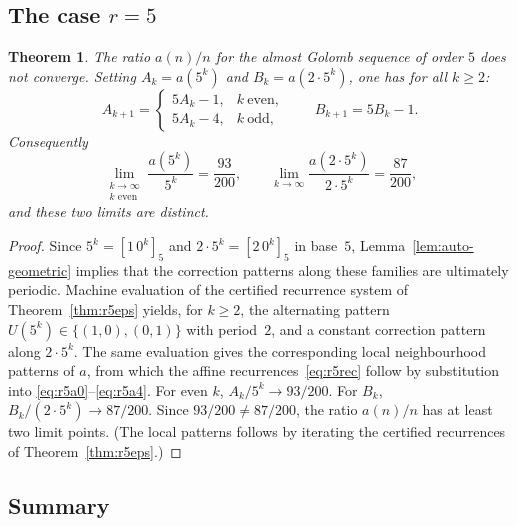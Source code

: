 \documentclass[12pt]{article}
\newtheorem{theorem}{Theorem}[section]
\theoremstyle{definition}
\theoremstyle{remark}
\begin{document}
\subsection{The case $r=5$}

\begin{theorem}\label{thm:ratio5}
The ratio $a(n)/n$ for the almost Golomb sequence of order $5$ does not converge.
Setting $A_k=a(5^k)$ and $B_k=a(2\cdot 5^k)$, one has for all $k\ge 2$:
\begin{equation}\label{eq:r5rec}
  A_{k+1} =
  \begin{cases}
    5A_k - 1, & k\ \text{even},\\
    5A_k - 4, & k\ \text{odd},
  \end{cases}
  \qquad
  B_{k+1} = 5B_k - 1.
\end{equation}
Consequently
\[
  \lim_{\substack{k\to\infty\\k\text{ even}}} \frac{a(5^k)}{5^k} = \frac{93}{200},
  \qquad
  \lim_{k\to\infty}\frac{a(2\cdot 5^k)}{2\cdot 5^k} = \frac{87}{200},
\]
and these two limits are distinct.
\end{theorem}

\begin{proof}
Since $5^k=[1\,0^k]_5$ and $2\cdot 5^k=[2\,0^k]_5$ in base~$5$,
Lemma~\ref{lem:auto-geometric} implies that the correction patterns along
these families are ultimately periodic.
Machine evaluation of the certified recurrence system of
Theorem~\ref{thm:r5eps} yields, for $k\ge 2$, the alternating pattern
$U(5^k)\in\{(1,0),(0,1)\}$ with period~$2$, and a constant correction pattern
along $2\cdot 5^k$.
The same evaluation gives the corresponding local neighbourhood patterns of $a$,
from which the affine recurrences~\eqref{eq:r5rec} follow by substitution into
\eqref{eq:r5a0}--\eqref{eq:r5a4}.
For even $k$, $A_k/5^k \to 93/200$.
For $B_k$, $B_k/(2\cdot 5^k)\to 87/200$.
Since $93/200\ne 87/200$, the ratio $a(n)/n$
has at least two limit points.
(The local patterns follows by iterating the certified recurrences of Theorem~\ref{thm:r5eps}.)
\end{proof}


\subsection{Summary}
\end{document}
